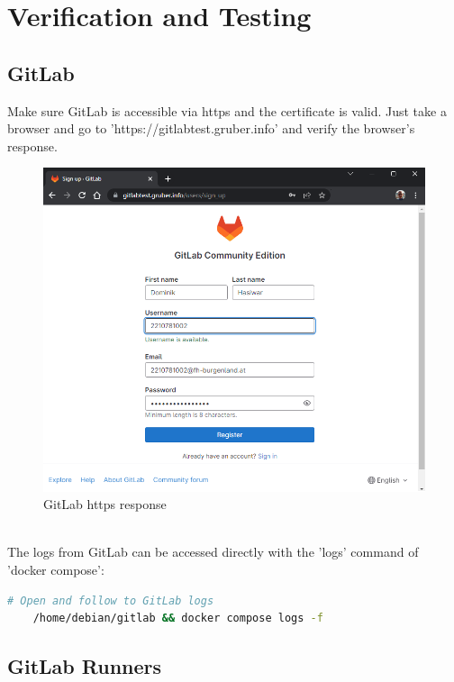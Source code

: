 \chapter{Verification and Testing}

\section{GitLab}

Make sure GitLab is accessible via https and the certificate is valid.
Just take a browser and go to 'https://gitlabtest.gruber.info' and verify the browser's response.

\begin{figure}[H]
	\centering
	\includegraphics[width=14cm]{images/gitlab_signup.png}
	\caption{GitLab https response}
	\label{fig:gitlab_response}
\end{figure}
\  \\

The logs from GitLab can be accessed directly with the 'logs' command of 'docker compose':
\begin{lstlisting}[language=bash,caption={Manage GitLab},label={code:gitlab-logging}]
    # Open and follow to GitLab logs
    /home/debian/gitlab && docker compose logs -f
\end{lstlisting}

\section{GitLab Runners}

